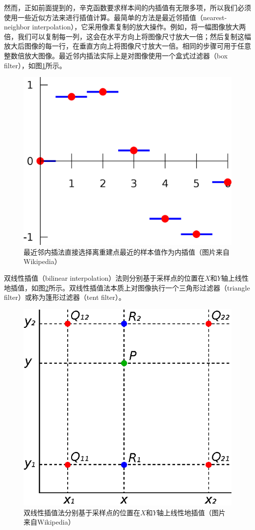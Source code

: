 然而，正如前面提到的，辛克函数要求样本间的内插值有无限多项，所以我们必须使用一些近似方法来进行插值计算。最简单的方法是最近邻插值（nearest-neighbor interpolation），它采用像素复制的放大操作。例如，将一幅图像放大两倍，我们可以复制每一列，这会在水平方向上将图像尺寸放大一倍；然后复制这幅放大后图像的每一行，在垂直方向上将图像尺寸放大一倍。相同的步骤可用于任意整数倍放大图像。最近邻内插法实际上是对图像使用一个盒式过滤器（box filter），如图\ref{f:intro-Piecewise_constant}所示。

\begin{figure}
\sidecaption
	\includegraphics[width=.4\textwidth]{figures/intro/Piecewise_constant}
	\caption{最近邻内插法直接选择离重建点最近的样本值作为内插值（图片来自Wikipedia）}
	\label{f:intro-Piecewise_constant}
\end{figure}

双线性插值（bilinear interpolation）法则分别基于采样点的位置在$X$和$Y$轴上线性地插值，如图\ref{f:intro-BilinearInterpolation}所示。双线性插值法本质上对图像执行一个三角形过滤器（triangle filter）或称为篷形过滤器（tent filter）。

\begin{figure}
\sidecaption
	\includegraphics[width=.4\textwidth]{figures/intro/BilinearInterpolation}
	\caption{双线性插值法分别基于采样点的位置在$X$和$Y$轴上线性地插值（图片来自Wikipedia）}
	\label{f:intro-BilinearInterpolation}
\end{figure}

